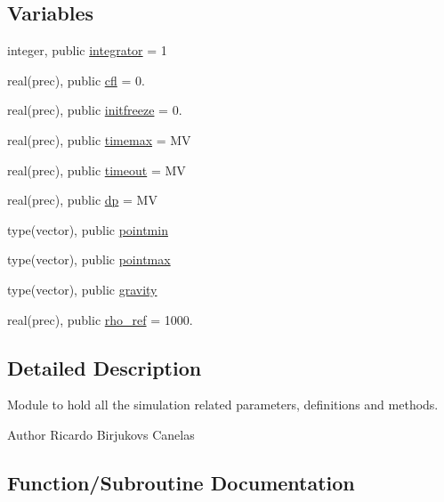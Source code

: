 \subsection*{Variables}
\begin{DoxyCompactItemize}
\item 
integer, public \mbox{\hyperlink{namespacesimulation__parameters_a0a398ad974eef004e43a347105e8ad81}{integrator}} = 1
\item 
real(prec), public \mbox{\hyperlink{namespacesimulation__parameters_a82ce5585265987eedbbaad0cd9cac673}{cfl}} = 0.
\item 
real(prec), public \mbox{\hyperlink{namespacesimulation__parameters_add65346bea9045d3ea4573be190f7cdc}{initfreeze}} = 0.
\item 
real(prec), public \mbox{\hyperlink{namespacesimulation__parameters_aedd90d7d1a6db61fcac836ac37034e75}{timemax}} = MV
\item 
real(prec), public \mbox{\hyperlink{namespacesimulation__parameters_a70ee14718c33544ce34bf7990211e5cc}{timeout}} = MV
\item 
real(prec), public \mbox{\hyperlink{namespacesimulation__parameters_afe85a1735413a2cc7a220910f68bd214}{dp}} = MV
\item 
type(vector), public \mbox{\hyperlink{namespacesimulation__parameters_acb9016ab495389a3b970541d9ec585cf}{pointmin}}
\item 
type(vector), public \mbox{\hyperlink{namespacesimulation__parameters_ac8471983089d031118d18a4b498d4e0d}{pointmax}}
\item 
type(vector), public \mbox{\hyperlink{namespacesimulation__parameters_a5f4b25aae7394e93796760f8720af525}{gravity}}
\item 
real(prec), public \mbox{\hyperlink{namespacesimulation__parameters_afde4a9da604d884c51389f6fa871e521}{rho\+\_\+ref}} = 1000.
\end{DoxyCompactItemize}


\subsection{Detailed Description}
Module to hold all the simulation related parameters, definitions and methods. 

\begin{DoxyAuthor}{Author}
Ricardo Birjukovs Canelas 
\end{DoxyAuthor}


\subsection{Function/\+Subroutine Documentation}
\mbox{\label{namespacesimulation__parameters_a71f285f54b412efac79d40c9ecd58037}} 
